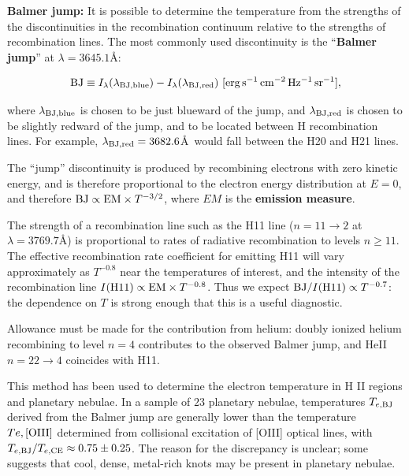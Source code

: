\documentclass[a4paper,10pt]{article}
\begin{document}
{\noindent}\textbf{Balmer jump:} It is possible to determine the temperature from the strengths of the discontinuities in the recombination continuum relative to the strengths of recombination lines. The most commonly used discontinuity is the ``\textbf{Balmer jump}'' at $\lambda=3645.1$\AA: 

\begin{align*}
    {\rm BJ}\equiv I_\lambda(\lambda_{\rm BJ,blue}) - I_\lambda(\lambda_{\rm BJ,red}) ~ [{\rm erg\,s^{-1}\,cm^{-2}\,Hz^{-1}\,sr^{-1}}],
\end{align*}

{\noindent}where $\lambda_{\rm BJ,blue}$ is chosen to be just blueward of the jump, and $\lambda_{\rm BJ,red}$ is chosen to be slightly redward of the jump, and to be located between H recombination lines. For example, $\lambda_{\rm BJ,red}=3682.6$\AA~would fall between the H20 and H21 lines.

{\noindent}The ``jump'' discontinuity is produced by recombining electrons with zero kinetic energy, and is therefore proportional to the electron energy distribution at $E=0$, and therefore ${\rm BJ}\propto{\rm EM}\times T^{-3/2}$, where $EM$ is the \textbf{emission measure}.

{\noindent}The strength of a recombination line such as the H11 line ($n=11\rightarrow2$ at $\lambda=3769.7$\AA) is proportional to rates of radiative recombination to levels $n\geq11$. The effective recombination rate coefficient for emitting H11 will vary approximately as $T^{-0.8}$ near the temperatures of interest, and the intensity of the recombination line $I({\rm H11})\propto{\rm EM}\times T^{-0.8}$. Thus we expect ${\rm BJ}/I({\rm H11})\propto T^{-0.7}$: the dependence
on $T$ is strong enough that this is a useful diagnostic.

{\noindent}Allowance must be made for the contribution from helium: doubly ionized helium recombining to level $n=4$ contributes to the observed Balmer jump, and HeII $n=22\rightarrow4$ coincides with H11.

{\noindent}This method has been used to determine the electron temperature in H II regions and planetary nebulae. In a sample of $23$ planetary nebulae, temperatures $T_{e,{\rm BJ}}$ derived from the Balmer jump are generally lower than the temperature $Te,{\rm [OIII]}$ determined from collisional excitation of [OIII] optical lines, with $T_{e,{\rm BJ}}/T_{e,{\rm CE}}\approx0.75\pm0.25$. The reason for the discrepancy is unclear; some suggests that cool, dense, metal-rich knots may be present in planetary nebulae.
\end{document}
